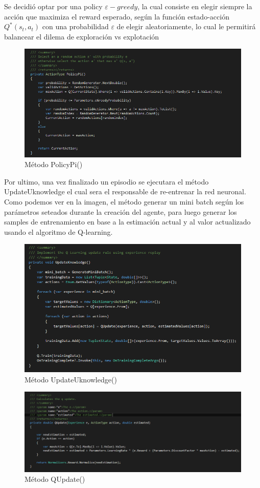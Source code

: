 Se decidió optar por una policy $\varepsilon-greedy$, la cual consiste en elegir siempre la acción que maximiza el reward esperado, según la función estado-acción $Q^*(s_t, a_t)$ con una probabilidad $\varepsilon$ de elegir aleatoriamente, lo cual le permitirá balancear el dilema de exploración vs explotación

\begin{figure}[h!]
	\centering
	\includegraphics[scale=0.5]{imagenes/screen7.png}
	\caption{Método PolicyPi()}
\end{figure}

Por ultimo, una vez finalizado un episodio se ejecutara el método UpdateUknowledge el cual sera el responsable de re-entrenar la red neuronal. Como podemos ver en la imagen, el método generar un mini batch según los parámetros seteados durante la creación del agente, para luego generar los samples de entrenamiento en base a la estimación actual y al valor actualizado usando el algoritmo de Q-learning.
\begin{figure}[h!]
	\centering
	\includegraphics[scale=0.7]{imagenes/screen8.png}
	\caption{Método UpdateUknowledge()}
\end{figure}

\begin{figure}[h!]
	\centering
	\includegraphics[scale=0.7]{imagenes/screen9.png}
	\caption{Método QUpdate()}
\end{figure}